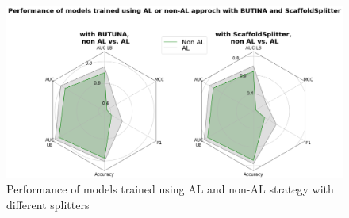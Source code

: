\documentclass[a4paper,10pt]{article}
\begin{document}
\begin{figure}
    \centering
    \includegraphics[keepaspectratio=true, scale=0.32]{images/splitters.png}
    \caption{Performance of models trained using AL and non-AL strategy with different splitters}
    \label{fig:3}
\end{figure}


\medskip



\end{document}

